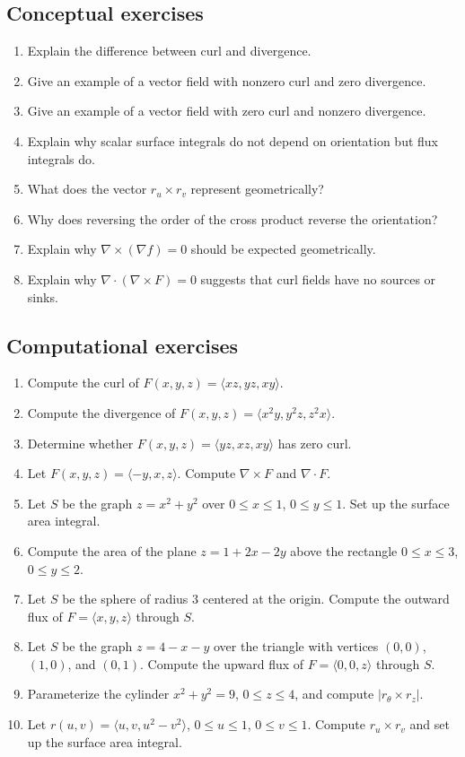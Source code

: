 \documentclass[11pt]{article}
\newcommand{\grad}{\nabla}
\begin{document}
\subsection*{Conceptual exercises}
\begin{enumerate}
  \item Explain the difference between curl and divergence.
  \item Give an example of a vector field with nonzero curl and zero divergence.
  \item Give an example of a vector field with zero curl and nonzero divergence.
  \item Explain why scalar surface integrals do not depend on orientation but flux integrals do.
  \item What does the vector $r_u\times r_v$ represent geometrically?
  \item Why does reversing the order of the cross product reverse the orientation?
  \item Explain why $\grad\times(\grad f)=0$ should be expected geometrically.
  \item Explain why $\grad\cdot(\grad\times F)=0$ suggests that curl fields have no sources or sinks.
\end{enumerate}

\subsection*{Computational exercises}
\begin{enumerate}[start=9]
  \item Compute the curl of $F(x,y,z)=\langle xz,yz,xy\rangle$.
  \item Compute the divergence of $F(x,y,z)=\langle x^2y,y^2z,z^2x\rangle$.
  \item Determine whether $F(x,y,z)=\langle yz,xz,xy\rangle$ has zero curl.
  \item Let $F(x,y,z)=\langle -y,x,z\rangle$. Compute $\grad\times F$ and $\grad\cdot F$.
  \item Let $S$ be the graph $z=x^2+y^2$ over $0\le x\le 1$, $0\le y\le 1$. Set up the surface area integral.
  \item Compute the area of the plane $z=1+2x-2y$ above the rectangle $0\le x\le 3$, $0\le y\le 2$.
  \item Let $S$ be the sphere of radius $3$ centered at the origin. Compute the outward flux of $F=\langle x,y,z\rangle$ through $S$.
  \item Let $S$ be the graph $z=4-x-y$ over the triangle with vertices $(0,0)$, $(1,0)$, and $(0,1)$. Compute the upward flux of $F=\langle 0,0,z\rangle$ through $S$.
  \item Parameterize the cylinder $x^2+y^2=9$, $0\le z\le 4$, and compute $|r_\theta\times r_z|$.
  \item Let $r(u,v)=\langle u,v,u^2-v^2\rangle$, $0\le u\le 1$, $0\le v\le 1$. Compute $r_u\times r_v$ and set up the surface area integral.
\end{enumerate}
\end{document}
